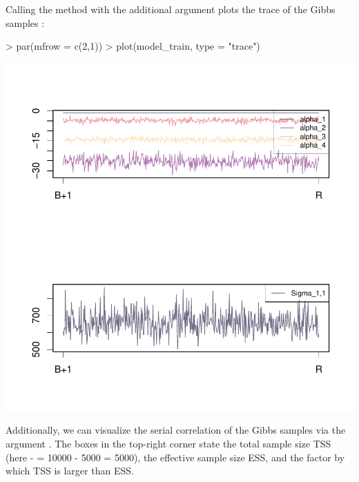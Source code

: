\documentclass[article]{jss}
\newcommand{\fct}[1]{\code{#1()}}
\begin{document}
Calling the \fct{plot} method with the additional argument  plots the trace of the Gibbs samples :

\begin{Schunk}
\begin{Sinput}
> par(mfrow = c(2,1))
> plot(model_train, type = "trace")
\end{Sinput}
\end{Schunk}
\includegraphics{rprobitb_oelschlaeger_bauer-plot-trace-model-train}

Additionally, we can visualize the serial correlation of the Gibbs samples via the argument . The boxes in the top-right corner state the total sample size TSS (here  -  = 10000 - 5000 = 5000), the effective sample size ESS, and the factor by which TSS is larger than ESS.
\end{document}
